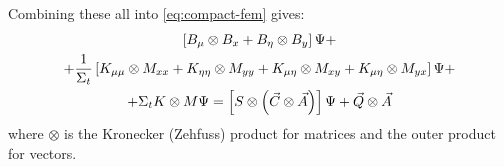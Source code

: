 \begin{frame}[allowframebreaks]
  Combining these all into \cref{eq:compact-fem} gives:
  \begin{multline}
    \left[B_\mu\otimes B_x+B_\eta\otimes B_y\right]\Psi +\\+
    \frac{1}{\Sigma_t}\left[K_{\mu\mu}\otimes M_{xx}+K_{\eta\eta}\otimes M_{yy}+K_{\mu\eta}\otimes M_{xy}+K_{\mu\eta}\otimes M_{yx}\right]\Psi+\\+
    \Sigma_t K\otimes M\Psi = \left[S\otimes \left(\vec{C}\otimes\vec{A}\right)\right]\Psi+\vec{Q}\otimes \vec{A}
  \end{multline}
  where $\otimes$ is the Kronecker (Zehfuss) product for matrices and the outer product for vectors.

\end{frame}
